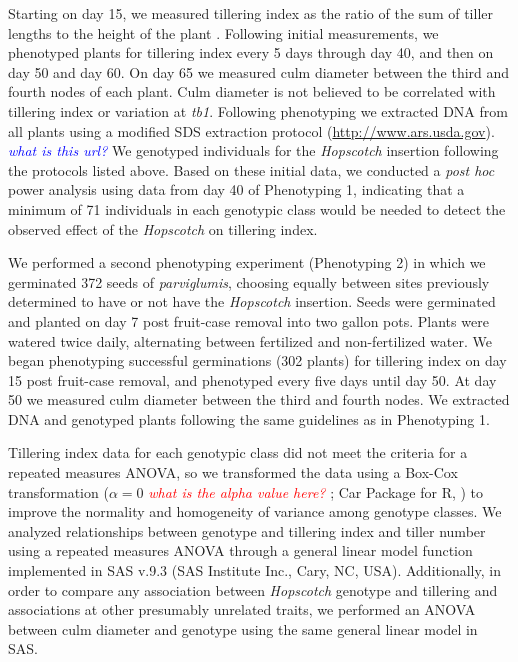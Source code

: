 \documentclass[11pt]{article}
\newcommand{\jri}[1]{\textcolor{blue}{ \emph{\scriptsize  #1}} }
\newcommand{\mbh}[1]{\textcolor{red}{ \emph{\scriptsize  #1}} }
\begin{document}
\begin{linenumbers}
\begin{flushleft}
Starting on day 15, we measured tillering index as the ratio of the sum of tiller lengths to the height of the plant \citep{Briggs2007}. Following initial measurements, we phenotyped plants for tillering index every 5 days through day 40, and then on day 50 and day 60. On day 65 we measured culm diameter between the third and fourth nodes of each plant. Culm diameter is not believed to be correlated with tillering index or variation at \emph{tb1}. Following phenotyping we extracted DNA from all plants using a modified SDS extraction protocol (\url{http://www.ars.usda.gov}). \jri{what is this url?} We genotyped individuals for the \emph{Hopscotch} insertion following the protocols listed above. Based on these initial data, we conducted a \emph{post hoc} power analysis using data from day 40 of Phenotyping 1, indicating that a minimum of 71 individuals in each genotypic class would be needed to detect the observed effect of the \emph{Hopscotch} on tillering index.

We performed a second phenotyping experiment (Phenotyping 2) in which we germinated 372 seeds of \emph{parviglumis}, choosing equally between sites previously determined to have or not have the \emph{Hopscotch} insertion. Seeds were germinated and planted on day 7 post fruit-case removal into two gallon pots. Plants were watered twice daily, alternating between fertilized and non-fertilized water. We began phenotyping successful germinations (302 plants) for tillering index on day 15 post fruit-case removal, and phenotyped every five days until day 50. At day 50 we measured culm diameter between the third and fourth nodes. We extracted DNA and genotyped plants following the same guidelines as in Phenotyping 1. 

Tillering index data for each genotypic class did not meet the criteria for a repeated measures ANOVA, so we transformed the data using a Box-Cox transformation ($\alpha=0$ \mbh{what is the alpha value here?}; Car Package for R, \citealt{FoxWeisberg2011}) to improve the normality and homogeneity of variance among genotype classes.  We analyzed relationships between genotype and tillering index and tiller number using a repeated measures ANOVA through a general linear model function implemented in SAS v.9.3 (SAS Institute Inc., Cary, NC, USA). Additionally, in order to compare any association between \emph{Hopscotch} genotype and tillering and associations at other presumably unrelated traits, we performed an ANOVA between culm diameter and genotype using the same general linear model in SAS.


\end{flushleft}
\end{linenumbers}
\end{document}
